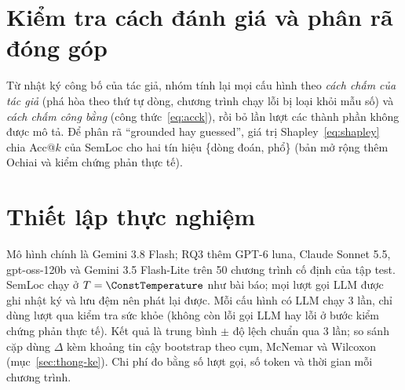 \section{Kiểm tra cách đánh giá và phân rã đóng góp}
\label{sec:audit-phan-ra}

Từ nhật ký công bố của tác giả, nhóm tính lại mọi cấu hình theo \emph{cách chấm của tác giả} (phá hòa theo thứ tự dòng,
chương trình chạy lỗi bị loại khỏi mẫu số) và \emph{cách chấm công bằng} (công thức~\eqref{eq:acck}), rồi bỏ lần lượt
các thành phần không được mô tả. Để phân rã ``grounded hay guessed'', giá trị Shapley~\eqref{eq:shapley} chia Acc@$k$
của SemLoc cho hai tín hiệu \{dòng đoán, phổ\} (bản mở rộng thêm Ochiai và kiểm chứng phản thực tế).

\section{Thiết lập thực nghiệm}
\label{sec:thiet-lap}

Mô hình chính là Gemini 3.8 Flash; RQ3 thêm GPT-6 luna, Claude Sonnet 5.5, gpt-oss-120b và Gemini 3.5 Flash-Lite trên
50 chương trình cố định của tập test. SemLoc chạy ở $T = \ConstTemperature$ như bài báo; mọi lượt gọi LLM được ghi nhật ký
và lưu đệm nên phát lại được. Mỗi cấu hình có LLM chạy 3 lần, chỉ dùng lượt qua kiểm tra sức khỏe (không còn lỗi gọi
LLM hay lỗi ở bước kiểm chứng phản thực tế). Kết quả là trung bình $\pm$ độ lệch chuẩn qua 3 lần; so sánh cặp dùng
$\Delta$ kèm khoảng tin cậy bootstrap theo cụm, McNemar và Wilcoxon (mục~\ref{sec:thong-ke}). Chi phí đo bằng số lượt
gọi, số token và thời gian mỗi chương trình.
